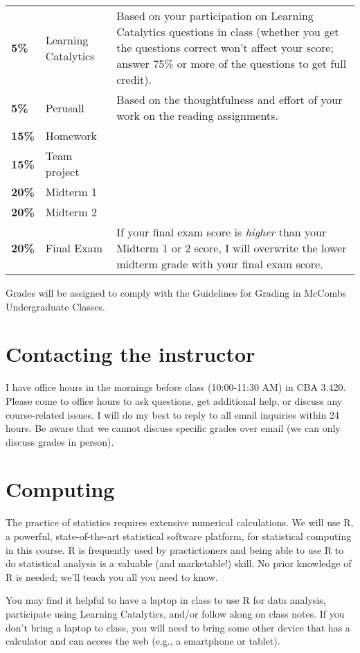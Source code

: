 \documentclass[12pt]{article}
\begin{document}
\begin{tabular}{llp{4in}}
\textbf{5\%} & Learning Catalytics & Based on your participation on Learning Catalytics questions in class (whether you get the questions correct won't affect your score; answer 75\% or more of the questions to get full credit). \\
\textbf{5\%} & Perusall & Based on the thoughtfulness and effort of your work on the reading assignments. \\
\textbf{15\%} & Homework &  \\
\textbf{15\%} & Team project \\
\textbf{20\%} & Midterm 1 & \\
\textbf{20\%} & Midterm 2 & \\
\textbf{20\%} & Final Exam & If your final exam score is \emph{higher} than your Midterm 1 or 2 score, I will overwrite the lower midterm grade with your final exam score. \\
\end{tabular}
\renewcommand{\arraystretch}{1}


Grades will be assigned to comply with the Guidelines for Grading in McCombs Undergraduate Classes.


\section*{Contacting the instructor}


I have office hours in the mornings before class (10:00-11:30 AM) in CBA 3.420.  Please come to office hours to ask questions, get additional help, or discuss any course-related issues.  I will do my best to reply to all email inquiries within 24 hours.  Be aware that we cannot discuss specific grades over email (we can only discuss grades in person).


\section*{Computing}


The practice of statistics requires extensive numerical calculations. We will use R, a powerful, state-of-the-art statistical software platform, for statistical computing in this course.  R is frequently used by practictioners and being able to use R to do statistical analysis is a valuable (and marketable!) skill.  No prior knowledge of R is needed; we'll teach you all you need to know.


You may find it helpful to have a laptop in class to use R for data analysis, participate using Learning Catalytics, and/or follow along on class notes.  If you don't bring a laptop to class, you will need to bring some other device that has a calculator and can access the web (e.g., a smartphone or tablet).
\end{document}
